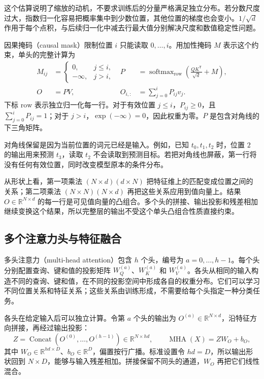 这个估算说明了缩放的动机，不要求训练后的分量严格满足独立分布。若分数尺度过大，指数归一化容易把概率集中到少数位置，其他位置的梯度也会变小。$1/\sqrt d$ 作用于每个点积，与后续归一化中减去行最大值分别解决尺度和数值稳定性问题。

因果掩码（causal mask）限制位置 $i$ 只能读取 $0,\ldots,i$。用加性掩码 $M$ 表示这个约束，单头的完整计算为
\begin{equation}
\begin{aligned}
  M_{ij}&=\begin{cases}0,&j\leq i,\\-\infty,&j>i,\end{cases}
  &P&=\operatorname{softmax}_{\mathrm{row}}\!\left(\frac{QK^{\mathsf T}}{\sqrt d}+M\right),\\
  O&=PV,
  &O_{i,:}&=\sum_{j=0}^{i}P_{ij}v_j.
\end{aligned}
\label{l12:eq:attention}
\end{equation}
下标 $\mathrm{row}$ 表示独立归一化每一行。对于有效位置 $j\leq i$，$P_{ij}\geq0$，且 $\sum_{j=0}^{i}P_{ij}=1$；对于 $j>i$，$\exp(-\infty)=0$，因此权重为零。$P$ 是包含对角线的下三角矩阵。

对角线保留是因为当前位置的词元已经是输入。例如，已知 $t_0,t_1,t_2$ 时，位置 $2$ 的输出用来预测 $t_3$，读取 $t_2$ 不会读取到预测目标。若把对角线也屏蔽，第一行将没有任何有效位置，同时改变模型原本的条件分布。

从形状上看，第一项乘法 $(N\times d)(d\times N)$ 把特征维上的匹配变成位置之间的关系；第二项乘法 $(N\times N)(N\times d)$ 再把这些关系应用到值向量上。结果 $O\in\mathbb{R}^{N\times d}$ 的每一行是可见值向量的凸组合。多个头的拼接、输出投影和残差相加继续变换这个结果，所以完整层的输出不受这个单头凸组合性质直接约束。

\subsection{多个注意力头与特征融合}

多头注意力（multi-head attention）包含 $h$ 个头，编号为 $a=0,\ldots,h-1$。每个头分别配置查询、键和值的投影矩阵 $W_Q^{(a)}$、$W_K^{(a)}$ 和 $W_V^{(a)}$。各头从相同的输入构造不同的查询、键和值，在不同的投影空间中形成各自的权重分布。它们可以学习不同位置关系和特征关系；这些关系由训练形成，不需要给每个头指定一种分类任务。

各头在给定输入后可以独立计算。令第 $a$ 个头的输出为 $O^{(a)}\in\mathbb{R}^{N\times d}$，沿特征方向拼接，再经过输出投影：
\begin{equation}
  Z=\operatorname{Concat}\!\left(O^{(0)},\ldots,O^{(h-1)}\right)
  \in\mathbb{R}^{N\times hd},\qquad
  \operatorname{MHA}(X)=ZW_O+b_O,
  \label{l12:eq:mha}
\end{equation}
其中 $W_O\in\mathbb{R}^{hd\times D}$、$b_O\in\mathbb{R}^D$，偏置按行广播。标准设置令 $hd=D$，所以输出形状回到 $N\times D$，能够与输入残差相加。拼接保留不同头的通道，$W_O$ 再把它们线性混合。

